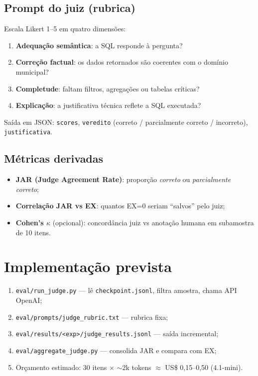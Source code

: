 \subsection{Prompt do juiz (rubrica)}

Escala Likert 1--5 em quatro dimensões:

\begin{enumerate}
    \item \textbf{Adequação semântica}: a SQL responde à pergunta?
    \item \textbf{Correção factual}: os dados retornados são coerentes com o domínio municipal?
    \item \textbf{Completude}: faltam filtros, agregações ou tabelas críticas?
    \item \textbf{Explicação}: a justificativa técnica reflete a SQL executada?
\end{enumerate}

Saída em JSON: \texttt{scores}, \texttt{veredito} (correto / parcialmente correto / incorreto), \texttt{justificativa}.

\subsection{Métricas derivadas}

\begin{itemize}
    \item \textbf{JAR (Judge Agreement Rate)}: proporção \textit{correto} ou \textit{parcialmente correto};
    \item \textbf{Correlação JAR vs EX}: quantos EX=0 seriam ``salvos'' pelo juiz;
    \item \textbf{Cohen's $\kappa$} (opcional): concordância juiz vs anotação humana em subamostra de 10 itens.
\end{itemize}

\section{Implementação prevista}

\begin{enumerate}
    \item \texttt{eval/run\_judge.py} --- lê \texttt{checkpoint.jsonl}, filtra amostra, chama API OpenAI;
    \item \texttt{eval/prompts/judge\_rubric.txt} --- rubrica fixa;
    \item \texttt{eval/results/<exp>/judge\_results.jsonl} --- saída incremental;
    \item \texttt{eval/aggregate\_judge.py} --- consolida JAR e compara com EX;
    \item Orçamento estimado: 30 itens $\times$ $\sim$2k tokens $\approx$ US\$ 0,15--0,50 (4.1-mini).
\end{enumerate}

